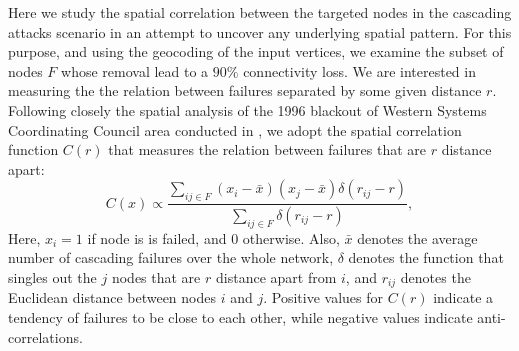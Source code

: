 Here we study the spatial correlation between the targeted nodes in the cascading attacks scenario in an attempt to uncover any underlying spatial pattern. For this purpose, and using the geocoding of the input vertices, we examine the subset of nodes $F$ whose removal lead to a $90 \%$ connectivity loss. We are interested in measuring the the relation between failures separated by some given distance $r$. Following closely the spatial analysis of the 1996 blackout of Western Systems Coordinating Council area conducted in \cite{DaqingAl14}, we adopt the spatial correlation function $C(r)$ that measures the relation between failures that are $r$ distance apart:
\begin{equation}
C(x) \propto \frac{\sum_{{ij}\in F} (x_i- \bar{x} )(x_j - \bar{x}) \delta(r_{ij} - r)}{\sum_{ij \in F} \delta (r_{ij} - r)},
\end{equation}
Here, $x_i=1$ if node is is failed, and $0$ otherwise. Also, $\bar{x}$ denotes the average number of cascading failures over the whole network, $\delta$ denotes the function that singles out the $j$ nodes that are $r$ distance apart from $i$, and $r_{ij}$ denotes the Euclidean distance between nodes $i$ and $j$. Positive values for $C(r)$ indicate a tendency of failures to be close to each other, while negative values indicate anti-correlations.  



